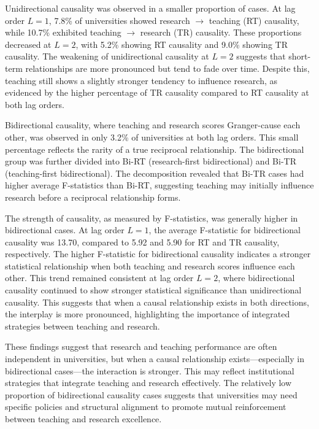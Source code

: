 \documentclass[a4paper, conference]{IEEEtran}
\begin{document}
Unidirectional causality was observed in a smaller proportion of cases. At lag order $L=1$, 7.8\% of universities showed research $\rightarrow$ teaching (RT) causality, while 10.7\% exhibited teaching $\rightarrow$ research (TR) causality. These proportions decreased at $L=2$, with 5.2\% showing RT causality and 9.0\% showing TR causality. The weakening of unidirectional causality at $L=2$ suggests that short-term relationships are more pronounced but tend to fade over time. Despite this, teaching still shows a slightly stronger tendency to influence research, as evidenced by the higher percentage of TR causality compared to RT causality at both lag orders.

Bidirectional causality, where teaching and research scores Granger-cause each other, was observed in only 3.2\% of universities at both lag orders. This small percentage reflects the rarity of a true reciprocal relationship. The bidirectional group was further divided into Bi-RT (research-first bidirectional) and Bi-TR (teaching-first bidirectional). The decomposition revealed that Bi-TR cases had higher average F-statistics than Bi-RT, suggesting teaching may initially influence research before a reciprocal relationship forms.

The strength of causality, as measured by F-statistics, was generally higher in bidirectional cases. At lag order $L=1$, the average F-statistic for bidirectional causality was 13.70, compared to 5.92 and 5.90 for RT and TR causality, respectively. The higher F-statistic for bidirectional causality indicates a stronger statistical relationship when both teaching and research scores influence each other. This trend remained consistent at lag order $L=2$, where bidirectional causality continued to show stronger statistical significance than unidirectional causality. This suggests that when a causal relationship exists in both directions, the interplay is more pronounced, highlighting the importance of integrated strategies between teaching and research.

These findings suggest that research and teaching performance are often independent in universities, but when a causal relationship exists—especially in bidirectional cases—the interaction is stronger. This may reflect institutional strategies that integrate teaching and research effectively. The relatively low proportion of bidirectional causality cases suggests that universities may need specific policies and structural alignment to promote mutual reinforcement between teaching and research excellence.
\end{document}
